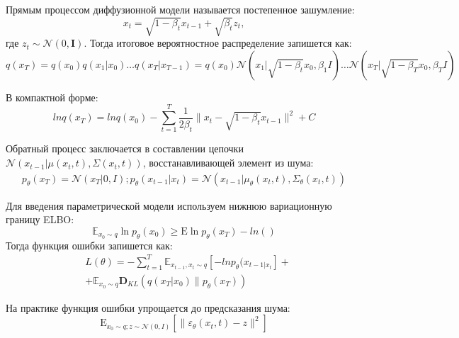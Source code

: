 Прямым процессом диффузионной модели называется 
постепенное зашумление:\begin{equation}
    x_t = \sqrt{1-\beta_t} x_{t-1} + \sqrt{\beta_t} z_t,
\end{equation}
где $z_t \sim \mathcal{N}(0,\mathbf{I})$. Тогда итоговое 
вероятностное распределение запишется как:
\begin{equation}
    q(x_{T}) = q(x_0)q(x_1|x_0) \dots q(x_T|x_{T-1}) =
    q(x_0) \mathcal{N}(x_1|\sqrt{1-\beta_t}x_0,\beta_1I)\dots
    \mathcal{N}(x_T|\sqrt{1-\beta_T}x_0,\beta_TI)
\end{equation}

В компактной форме:
\begin{equation}
    ln q(x_{T}) = ln q(x_0) - \sum_{t=1}^T \frac{1}{2\beta_t} \| x_t - \sqrt{1-\beta_t} x_{t-1} \|^2 + C
\end{equation}

Обратный процесс заключается в составлении цепочки 
$\mathcal{N}(x_{t-1}|\mu(x_t,t),\Sigma(x_t,t))$, восстанавливающей элемент из шума:
\begin{equation}
    \begin{aligned}
        p_\theta(x_T) = \mathcal{N}(x_T|0,I);
        p_\theta(x_{t-1}|x_t) = \mathcal{N}(x_{t-1}|\mu_\theta(x_t,t), \Sigma_\theta(x_t,t))
    \end{aligned}
\end{equation}

Для введения параметрической модели используем нижнюю вариационную границу ELBO:
\begin{equation}
    \mathbb{E}_{x_0 \sim q} \ln p_\theta(x_0) \ge \mathrm{E} \ln p_\theta(x_T) - ln()
\end{equation}
Тогда функция ошибки запишется как:\begin{equation}
    \begin{aligned}
        &L(\theta) = - \sum_{t=1}^T\mathbb{E}_{x_{t-1},x_t \sim q} \left[-ln p_\theta(x_{t-1|x_t}\right] + \\
        &+ \mathbb{E}_{x_0 \sim q} \mathbf{D}_{KL}(q(x_T|x_0) \parallel p_\theta (x_T))
    \end{aligned}
\end{equation}


На практике функция ошибки упрощается до предсказания шума:
\begin{equation}
    \mathrm{E}_{x_0 \sim q; z\sim \mathcal{N}(0,I)} 
    \left[ \| \varepsilon_\theta(x_t,t) -z \|^2\right]
\end{equation}


